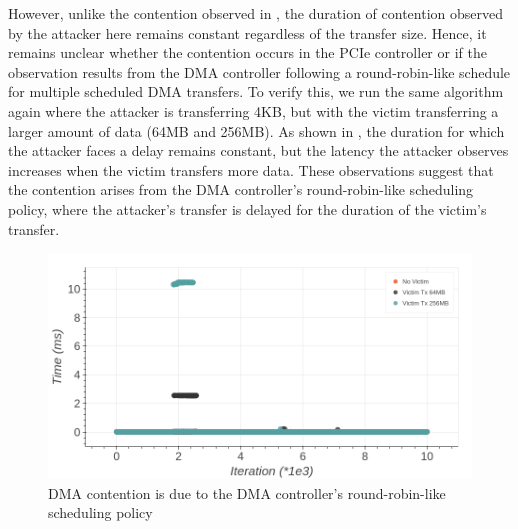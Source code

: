 However, unlike the contention observed in , the duration of contention observed by the attacker here remains constant regardless of the transfer size.
Hence, it remains unclear whether the contention occurs in the PCIe controller or if the observation results from the DMA controller following a round-robin-like schedule for multiple scheduled DMA transfers.
To verify this, we run the same algorithm again where the attacker is transferring 4KB, but with the victim transferring a larger amount of data (64MB and 256MB).
As shown in , the duration for which the attacker faces a delay remains constant, but the latency the attacker observes increases when the victim transfers more data.
These observations suggest that the contention arises from the DMA controller's round-robin-like scheduling policy, where the attacker's transfer is delayed for the duration of the victim's transfer.

\begin{figure}[!htb]
    \centering
    \includegraphics[width=\textwidth]{figures/interconnect-sc/dma/dma_contention_round_robin.png}
    \caption{DMA contention is due to the DMA controller's round-robin-like scheduling policy}
    \label{fig:dma-contention-round-robin}
\end{figure}